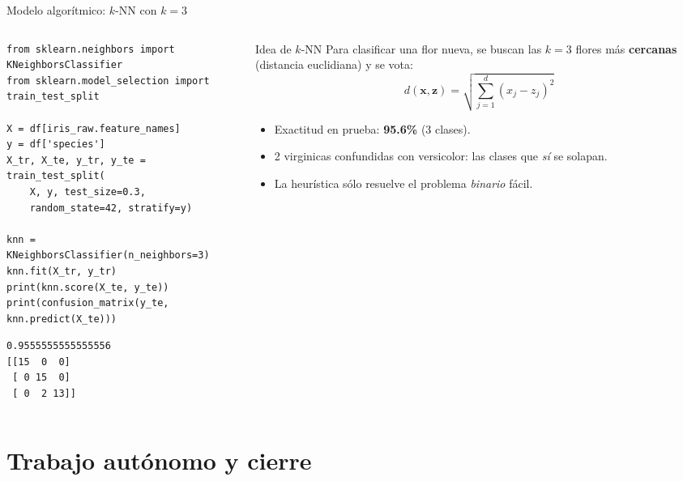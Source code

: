 \documentclass[10pt,aspectratio=169]{beamer}
\begin{document}
\begin{frame}[fragile]{Modelo algorítmico: $k$-NN con $k=3$}
  \begin{columns}[T]
    \begin{column}{0.55\textwidth}
\begin{lstlisting}
from sklearn.neighbors import KNeighborsClassifier
from sklearn.model_selection import train_test_split

X = df[iris_raw.feature_names]
y = df['species']
X_tr, X_te, y_tr, y_te = train_test_split(
    X, y, test_size=0.3,
    random_state=42, stratify=y)

knn = KNeighborsClassifier(n_neighbors=3)
knn.fit(X_tr, y_tr)
print(knn.score(X_te, y_te))
print(confusion_matrix(y_te, knn.predict(X_te)))
\end{lstlisting}
\begin{lstlisting}[style=salida]
0.9555555555555556
[[15  0  0]
 [ 0 15  0]
 [ 0  2 13]]
\end{lstlisting}
    \end{column}
    \begin{column}{0.43\textwidth}
      \small
      \begin{block}{Idea de $k$-NN}
        Para clasificar una flor nueva, se buscan las $k=3$ flores más \textbf{cercanas} (distancia euclidiana) y se vota:
        \[ d(\mathbf{x},\mathbf{z})=\sqrt{\textstyle\sum_{j=1}^{d}(x_j-z_j)^2} \]
      \end{block}
      \begin{itemize}
        \item Exactitud en prueba: \textbf{95.6\%} (3 clases).
        \item 2 virginicas confundidas con versicolor: las clases que \emph{sí} se solapan.
        \item La heurística sólo resuelve el problema \emph{binario} fácil.
      \end{itemize}
    \end{column}
  \end{columns}
\end{frame}

\section{Trabajo autónomo y cierre}
\end{document}
